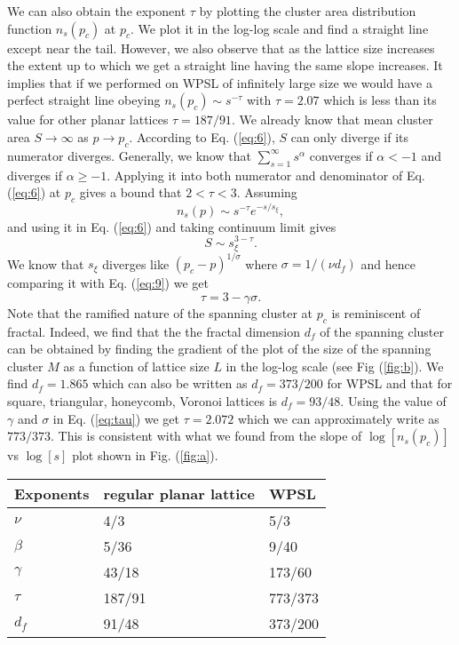﻿\documentclass[twocolumn,showpacs,preprintnumbers,amsmath,amssymb]{revtex4}
\begin{document}
We can also obtain the exponent $\tau$ by plotting the cluster area distribution function $n_s(p_c)$ at $p_c$. We
plot it in the log-log scale and find a straight line except near the tail. However, we also observe that 
as the lattice size increases the extent up to which we get a straight line having the same slope increases. It implies
that if we performed on WPSL of infinitely large size we would have a perfect straight line obeying
$n_s(p_c)\sim s^{-\tau}$
with $\tau=2.07$ which is less than its value for other planar lattices $\tau=187/91$. We already know that mean
cluster area $S\rightarrow \infty$ as $p\rightarrow p_c$. According to Eq. (\ref{eq:6}), $S$ can only diverge
if its numerator diverges. Generally, we know that $\sum_{s=1}^\infty s^\alpha$ converges if $\alpha<-1$ and diverges if 
$\alpha\geq -1$. Applying it into both numerator and denominator of Eq. (\ref{eq:6}) at $p_c$ gives a bound that
$2<\tau<3$. Assuming
\begin{equation}
n_s(p)\sim s^{-\tau}e^{-s/s_\xi},
\end{equation}
and using it in Eq. (\ref{eq:6}) and taking continuum limit gives
\begin{equation}
S\sim s_\xi^{3-\tau}.
\end{equation}
We know that $s_\xi$ diverges like $(p_c-p)^{1/\sigma}$ where $\sigma=1/(\nu d_f)$ and hence comparing it with Eq. (\ref{eq:9})
we get
\begin{equation}
\label{eq:tau}
\tau=3-\gamma \sigma.
\end{equation}
Note that the ramified nature of the spanning cluster at $p_c$ is reminiscent of fractal. Indeed, we find that the 
the fractal dimension $d_f$ of the spanning cluster can be obtained by finding 
the gradient of the plot of the size of the spanning cluster $M$ as a function of lattice size $L$ in the log-log scale (see Fig (\ref{fig:b}). We find $d_f=1.865$ which 
can also be written as $d_f=373/200$ for WPSL and that for  square, triangular, honeycomb,
Voronoi lattices is $d_f=93/48$. Using the value of $\gamma$ and $\sigma$ in Eq. (\ref{eq:tau}) we get 
$\tau=2.072$ which we can approximately write as $773/373$. This is consistent with what we found from the slope of $\log[n_s(p_c)]$ vs $\log[s]$ plot shown in Fig. (\ref{fig:a}).   



\begin{center}
    \begin{tabular}{| l | l | l |}
    \hline
    Exponents & regular planar lattice & WPSL \\ \hline
    $\nu$ & 4/3 & 5/3  \\ \hline
    $\beta$ & 5/36 & 9/40  \\ \hline
    $\gamma$ & 43/18 & 173/60  \\ \hline
   $ \tau$ & 187/91 & 773/373 \\ \hline
$d_f$ & 91/48 & 373/200 \\

    \hline
    \end{tabular}
\end{center}
\end{document}
